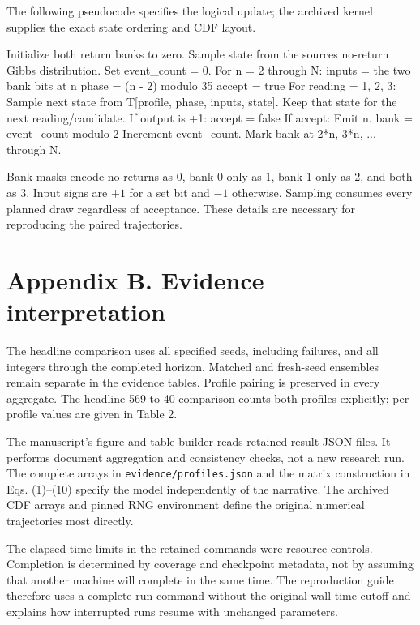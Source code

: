 \documentclass[
  11pt,
]{article}
\newenvironment{Shaded}{}{}
\newcommand{\NormalTok}[1]{#1}
\begin{document}
The following pseudocode specifies the logical update; the archived
kernel supplies the exact state ordering and CDF layout.

\begin{Shaded}
\begin{Highlighting}[]
\NormalTok{Initialize both return banks to zero.}
\NormalTok{Sample state from the source\textquotesingle{}s no{-}return Gibbs distribution.}
\NormalTok{Set event\_count = 0.}
\NormalTok{For n = 2 through N:}
\NormalTok{    inputs = the two bank bits at n}
\NormalTok{    phase = (n {-} 2) modulo 35}
\NormalTok{    accept = true}
\NormalTok{    For reading = 1, 2, 3:}
\NormalTok{        Sample next state from T[profile, phase, inputs, state].}
\NormalTok{        Keep that state for the next reading/candidate.}
\NormalTok{        If output is +1: accept = false}
\NormalTok{    If accept:}
\NormalTok{        Emit n.}
\NormalTok{        bank = event\_count modulo 2}
\NormalTok{        Increment event\_count.}
\NormalTok{        Mark bank at 2*n, 3*n, ... through N.}
\end{Highlighting}
\end{Shaded}

Bank masks encode no returns as 0, bank-0 only as 1, bank-1 only as 2,
and both as 3. Input signs are \(+1\) for a set bit and \(-1\)
otherwise. Sampling consumes every planned draw regardless of
acceptance. These details are necessary for reproducing the paired
trajectories.

\section{Appendix B. Evidence
interpretation}\label{appendix-b.-evidence-interpretation}

The headline comparison uses all specified seeds, including failures,
and all integers through the completed horizon. Matched and fresh-seed
ensembles remain separate in the evidence tables. Profile pairing is
preserved in every aggregate. The headline 569-to-40 comparison counts
both profiles explicitly; per-profile values are given in Table 2.

The manuscript's figure and table builder reads retained result JSON
files. It performs document aggregation and consistency checks, not a
new research run. The complete arrays in \texttt{evidence/profiles.json}
and the matrix construction in Eqs. (1)--(10) specify the model
independently of the narrative. The archived CDF arrays and pinned RNG
environment define the original numerical trajectories most directly.

The elapsed-time limits in the retained commands were resource controls.
Completion is determined by coverage and checkpoint metadata, not by
assuming that another machine will complete in the same time. The
reproduction guide therefore uses a complete-run command without the
original wall-time cutoff and explains how interrupted runs resume with
unchanged parameters.
\end{document}
